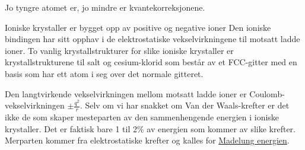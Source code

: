 \documentclass{article}
\begin{document}
Jo tyngre atomet er, jo mindre er kvantekorreksjonene.

Ioniske krystaller er bygget opp av positive og negative ioner Den ioniske bindingen har sitt opphav i de elektrostatiske vekselvirkningene til motsatt ladde ioner. To vanlig krystallstrukturer for slike ioniske krystaller er krystallstrukturene til salt og cesium-klorid som består av et FCC-gitter med en basis som har ett atom i seg over det normale gitteret. 

Den langtvirkende vekselvirkningen mellom motsatt ladde ioner er Coulomb-vekselvirkningen $\pm \frac{q^2}{r}$. Selv om vi har snakket om Van der Waals-krefter er det ikke de som skaper mesteparten av den sammenhengende energien i ioniske krystaller. Det er faktisk bare 1 til 2\% av energien som kommer av slike krefter. Merparten kommer fra elektrostatiske krefter og kalles for \underline{Madelung energien}.
\end{document}
